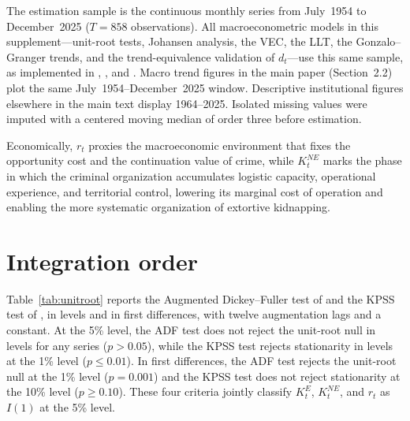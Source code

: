 \documentclass[ecta,nameyear,final,supplement]{econsocart}
\numberwithin{equation}{section}
\numberwithin{table}{section}
\theoremstyle{definition}
\newcommand{\KE}{K^{E}}
\newcommand{\KNE}{K^{NE}}
\begin{document}
The estimation sample is the continuous monthly series from July~1954 to
December~2025 ($T=858$ observations). All macroeconometric models in this
supplement---unit-root tests, Johansen analysis, the VEC, the LLT, the
Gonzalo--Granger trends, and the trend-equivalence validation of
$d_t$---use this same sample, as implemented in ,
, and . Macro trend
figures in the main paper (Section~2.2) plot the same July~1954--December~2025
window. Descriptive institutional figures elsewhere in the main text display
1964--2025. Isolated missing values were imputed with a centered moving median
of order three before estimation.

Economically, $r_t$ proxies the macroeconomic environment that fixes the
opportunity cost and the continuation value of crime, while $\KNE_t$ marks
the phase in which the criminal organization accumulates logistic capacity,
operational experience, and territorial control, lowering its marginal cost
of operation and enabling the more systematic organization of extortive
kidnapping.

\section{Integration order}
\label{sec:unitroot}

Table~\ref{tab:unitroot} reports the Augmented Dickey--Fuller test of
\citet{DickeyFuller1979} and the KPSS test of \citet{Kwiatkowski1992}, in
levels and in first differences, with twelve augmentation lags and a
constant. At the 5\% level, the ADF test does not reject the unit-root null in
levels for any series ($p>0.05$), while the KPSS test rejects stationarity
in levels at the 1\% level ($p\le 0.01$). In first differences, the ADF test
rejects the unit-root null at the 1\% level ($p=0.001$) and the KPSS test
does not reject stationarity at the 10\% level ($p\ge 0.10$). These four
criteria jointly classify $\KE_t$, $\KNE_t$, and $r_t$ as $I(1)$ at the 5\%
level.
\end{document}
